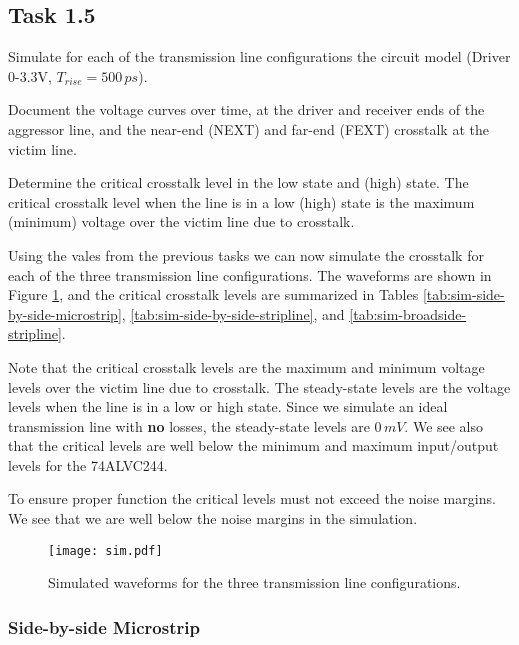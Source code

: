 \documentclass[../main.tex]{subfiles}
\begin{document}
\subsection{Task 1.5}

Simulate for each of the transmission line configurations the circuit model (Driver 0-3.3V, $T_{rise} = 500\,\si{ps}$).

\vspace{10pt}
Document the voltage curves over time, at the driver and receiver ends of the aggressor line, and the near-end (NEXT) and far-end (FEXT) crosstalk at the victim line.

\vspace{10pt}
Determine the critical crosstalk level in the low state and (high) state. The critical crosstalk level when the line is in a low (high) state is the maximum (minimum) voltage over the victim line due to crosstalk.

\solution

Using the vales from the previous tasks we can now simulate the crosstalk for each of the three transmission line configurations. The waveforms are shown in Figure \ref{fig:waveforms}, and the critical crosstalk levels are summarized in Tables \ref{tab:sim-side-by-side-microstrip}, \ref{tab:sim-side-by-side-stripline}, and \ref{tab:sim-broadside-stripline}.

\vspace{10pt}
Note that the critical crosstalk levels are the maximum and minimum voltage levels over the victim line due to crosstalk. The steady-state levels are the voltage levels when the line is in a low or high state. Since we simulate an ideal transmission line with \textbf{no} losses, the steady-state levels are $0\,\si{mV}$. We see also that the critical levels are well below the minimum and maximum input/output levels for the 74ALVC244.

\vspace{10pt}
To ensure proper function the critical levels must not exceed the noise margins. We see that we are well below the noise margins in the simulation.

\begin{figure}[h]
    \centering
    \texttt{[image: sim.pdf]}
    \caption{Simulated waveforms for the three transmission line configurations.}
    \label{fig:waveforms}
\end{figure}

\newpage

\subsubsection{Side-by-side Microstrip}
\end{document}
